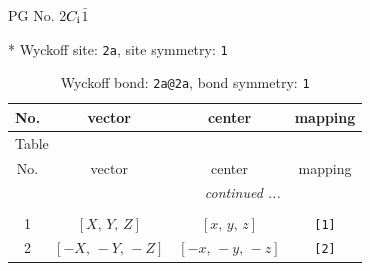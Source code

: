 \documentclass[fleqn,8pt]{jsarticle}
\begin{document}
\setcounter{MaxMatrixCols}{32}

\renewcommand{\tablename}{Table~}
\renewcommand{\figurename}{Figure~}
\begin{center}
\LARGE
PG No. 2\quad$C_{\rm i}$\quad$\bar{1}$\quad[ triclinic ]
\end{center}


* Wyckoff site: {\tt 2a}, site symmetry: {\tt 1}
\renewcommand{\arraystretch}{1.2}
\begin{longtable}{cccc}
\caption{Wyckoff bond: {\tt 2a@2a}, bond symmetry: {\tt 1}}
 \\
 \hline \hline
No. & vector & center & mapping \\ \hline \endfirsthead

\multicolumn{3}{l}{\tablename\ \thetable{}} \\
 \hline \hline
No. & vector & center & mapping \\ \hline \endhead

 \hline \hline
\multicolumn{3}{r}{\footnotesize\it continued ...} \\ \endfoot

 \hline \hline
\multicolumn{3}{r}{} \\ \endlastfoot

1 & $\left[ X,\, Y,\, Z \right]$ & $\left[ x,\, y,\, z \right]$ & {\tt [1]} \\ \hline
2 & $\left[ - X,\, - Y,\, - Z \right]$ & $\left[ - x,\, - y,\, - z \right]$ & {\tt [2]} \\
\end{longtable}
\end{document}
